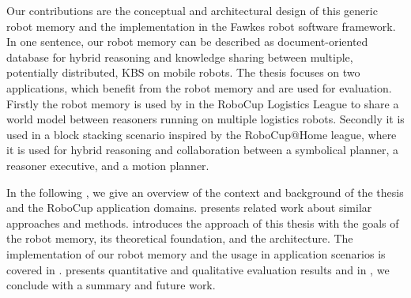 Our contributions are the conceptual and architectural design of this
generic robot memory and the implementation in the Fawkes robot
software framework. In one sentence, our robot memory can be described
as document-oriented database for hybrid reasoning and knowledge
sharing between multiple, potentially distributed, KBS on mobile robots. The thesis focuses on
two applications, which benefit from the robot memory and are used for
evaluation. Firstly the robot memory is used by in the RoboCup
Logistics League to share a world model between reasoners running on
multiple logistics robots. Secondly it is used in a block stacking
scenario inspired by the RoboCup@Home league, where it is used for
hybrid reasoning and collaboration between a symbolical
planner, a reasoner executive, and a motion planner.

In the following , we give an overview of the
context and background of the thesis and the RoboCup application
domains.  presents related work about similar
approaches and methods.   introduces the
approach of this thesis with the goals of the robot memory, its
theoretical foundation, and the architecture. The implementation of
our robot memory and the usage in application scenarios is covered in
.  presents quantitative and
qualitative evaluation results and in , we
conclude with a summary and future work.
